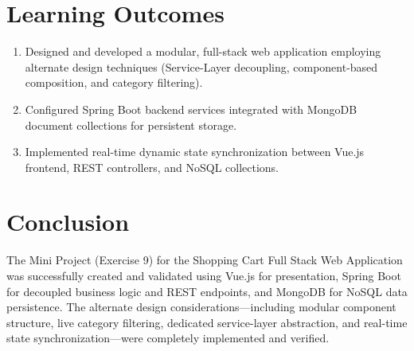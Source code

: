 \documentclass[11pt,a4paper]{article}
\begin{document}
\section{Learning Outcomes}
\begin{enumerate}
    \item Designed and developed a modular, full-stack web application employing alternate design techniques (Service-Layer decoupling, component-based composition, and category filtering).
    \item Configured Spring Boot backend services integrated with MongoDB document collections for persistent storage.
    \item Implemented real-time dynamic state synchronization between Vue.js frontend, REST controllers, and NoSQL collections.
\end{enumerate}

\section{Conclusion}
The Mini Project (Exercise 9) for the Shopping Cart Full Stack Web Application was successfully created and validated using Vue.js for presentation, Spring Boot for decoupled business logic and REST endpoints, and MongoDB for NoSQL data persistence. The alternate design considerations—including modular component structure, live category filtering, dedicated service-layer abstraction, and real-time state synchronization—were completely implemented and verified.
\end{document}
